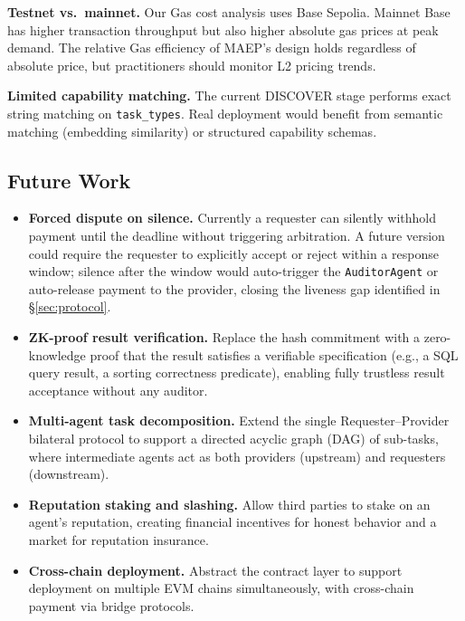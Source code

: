 \documentclass[conference]{IEEEtran}
\begin{document}
\textbf{Testnet vs.\ mainnet.}
Our Gas cost analysis uses Base Sepolia.  Mainnet Base has higher
transaction throughput but also higher absolute gas prices at peak
demand.  The relative Gas efficiency of MAEP's design holds regardless
of absolute price, but practitioners should monitor L2 pricing trends.

\textbf{Limited capability matching.}
The current DISCOVER stage performs exact string matching on
\texttt{task\_types}.  Real deployment would benefit from semantic
matching (embedding similarity) or structured capability schemas.

\subsection{Future Work}

\begin{itemize}
\item \textbf{Forced dispute on silence.}  Currently a requester can
  silently withhold payment until the deadline without triggering
  arbitration.  A future version could require the requester to
  explicitly accept or reject within a response window; silence after
  the window would auto-trigger the \texttt{AuditorAgent} or
  auto-release payment to the provider, closing the liveness gap
  identified in \S\ref{sec:protocol}.

\item \textbf{ZK-proof result verification.} Replace the hash
  commitment with a zero-knowledge proof that the result satisfies a
  verifiable specification (e.g., a SQL query result, a sorting
  correctness predicate), enabling fully trustless result acceptance
  without any auditor.

\item \textbf{Multi-agent task decomposition.} Extend the single
  Requester--Provider bilateral protocol to support a directed acyclic
  graph (DAG) of sub-tasks, where intermediate agents act as both
  providers (upstream) and requesters (downstream).

\item \textbf{Reputation staking and slashing.} Allow third parties to
  stake on an agent's reputation, creating financial incentives for
  honest behavior and a market for reputation insurance.

\item \textbf{Cross-chain deployment.} Abstract the contract layer to
  support deployment on multiple EVM chains simultaneously, with
  cross-chain payment via bridge protocols.
\end{itemize}
\end{document}
